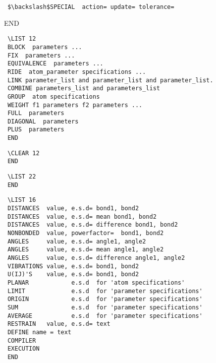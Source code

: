 \documentclass[10pt,a4paper]{report}
\begin{document}
\small\begin{verbatim}
 $\backslash$SPECIAL  action= update= tolerance=\end{verbatim}\normalsize


 END





\bigskip{}



\small\begin{verbatim}
 \LIST 12
 BLOCK  parameters ...
 FIX  parameters ...
 EQUIVALENCE  parameters ...
 RIDE  atom_parameter specifications ...
 LINK parameter_list and parameter_list and parameter_list.
 COMBINE parameters_list and parameters_list
 GROUP  atom specifications
 WEIGHT f1 parameters f2 parameters ...
 FULL  parameters
 DIAGONAL  parameters
 PLUS  parameters
 END
\end{verbatim}\normalsize




\bigskip{}



\small\begin{verbatim}
 \CLEAR 12
 END
\end{verbatim}\normalsize




\bigskip{}



\small\begin{verbatim}
 \LIST 22
 END
\end{verbatim}\normalsize




\bigskip{}



\small\begin{verbatim}
 \LIST 16
 DISTANCES  value, e.s.d= bond1, bond2
 DISTANCES  value, e.s.d= mean bond1, bond2
 DISTANCES  value, e.s.d= difference bond1, bond2
 NONBONDED  value, powerfactor=  bond1, bond2
 ANGLES     value, e.s.d= angle1, angle2
 ANGLES     value, e.s.d= mean angle1, angle2
 ANGLES     value, e.s.d= difference angle1, angle2
 VIBRATIONS value, e.s.d= bond1, bond2
 U(IJ)'S    value, e.s.d= bond1, bond2
 PLANAR            e.s.d  for 'atom specifications'
 LIMIT             e.s.d  for 'parameter specifications'
 ORIGIN            e.s.d  for 'parameter specifications'
 SUM               e.s.d  for 'parameter specifications'
 AVERAGE           e.s.d  for 'parameter specifications'
 RESTRAIN   value, e.s.d= text
 DEFINE name = text
 COMPILER
 EXECUTION
 END
\end{verbatim}\normalsize
\end{document}
